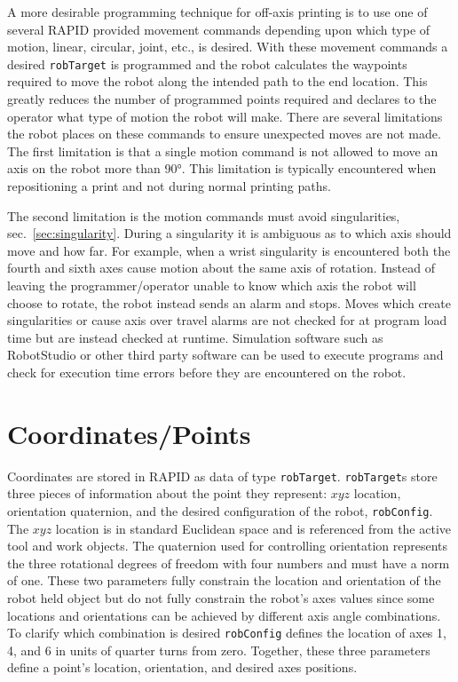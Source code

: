 \documentclass[main.tex]{subfiles}
\begin{document}
A more desirable programming technique for off-axis printing is to use one of several RAPID provided movement commands depending upon which type of motion, linear, circular, joint, etc., is desired.
With these movement commands a desired \texttt{robTarget} is programmed and the robot calculates the waypoints required to move the robot along the intended path to the end location.
This greatly reduces the number of programmed points required and declares to the operator what type of motion the robot will make.
There are several limitations the robot places on these commands to ensure unexpected moves are not made.
The first limitation is that a single motion command is not allowed to move an axis on the robot more than \ang{90}.
This limitation is typically encountered when repositioning a print and not during normal printing paths.

The second limitation is the motion commands must avoid singularities, sec.~\ref{sec:singularity}.
During a singularity it is ambiguous as to which axis should move and how far.
For example, when a wrist singularity is encountered both the fourth and sixth axes cause motion about the same axis of rotation.
Instead of leaving the programmer/operator unable to know which axis the robot will choose to rotate, the robot instead sends an alarm and stops.
Moves which create singularities or cause axis over travel alarms are not checked for at program load time but are instead checked at runtime.
Simulation software such as RobotStudio or other third party software can be used to execute programs and check for execution time errors before they are encountered on the robot.

\section{Coordinates/Points}
\label{sec:points}
Coordinates are stored in RAPID as data of type \texttt{robTarget}.
\texttt{robTarget}s store three pieces of information about the point they represent: $xyz$ location, orientation quaternion, and the desired configuration of the robot, \texttt{robConfig}.
The $xyz$ location is in standard Euclidean space and is referenced from the active tool and work objects.
The quaternion used for controlling orientation represents the three rotational degrees of freedom with four numbers and must have a norm of one.
These two parameters fully constrain the location and orientation of the robot held object but do not fully constrain the robot's axes values since some locations and orientations can be achieved by different axis angle combinations.
To clarify which combination is desired \texttt{robConfig} defines the location of axes 1, 4, and 6 in units of quarter turns from zero.
Together, these three parameters define a point's location, orientation, and desired axes positions.  
\end{document}
